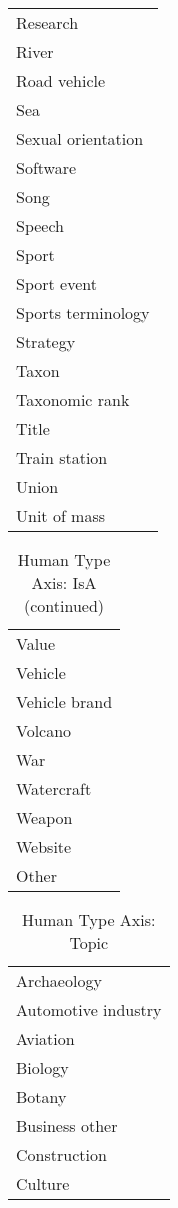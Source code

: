 \documentclass[letterpaper]{article}
\begin{document}
\begin{table*}[ht]
\begin{center}
\begin{tabular}{|l|}
Research\\
River\\
Road vehicle\\
Sea\\
Sexual orientation\\
Software\\
Song\\
Speech\\
Sport\\
Sport event\\
Sports terminology\\
Strategy\\
Taxon\\
Taxonomic rank\\
Title\\
Train station\\
Union\\
Unit of mass\\
\hline
\end{tabular}
\end{center}
\label{table:}
\end{table*}\begin{table*}[ht]
\caption{Human Type Axis: IsA (continued)}
\begin{center}
\begin{tabular}{|l|}\hline
Value\\
Vehicle\\
Vehicle brand\\
Volcano\\
War\\
Watercraft\\
Weapon\\
Website\\
Other\\
\hline
\end{tabular}
\end{center}
\label{table:}
\end{table*}\begin{table*}[ht]
\caption{Human Type Axis: Topic}
\begin{center}
\begin{tabular}{|l|}\hline
Archaeology\\
Automotive industry\\
Aviation\\
Biology\\
Botany\\
Business other\\
Construction\\
Culture\\

\end{tabular}
\end{center}
\end{table*}
\end{document}
